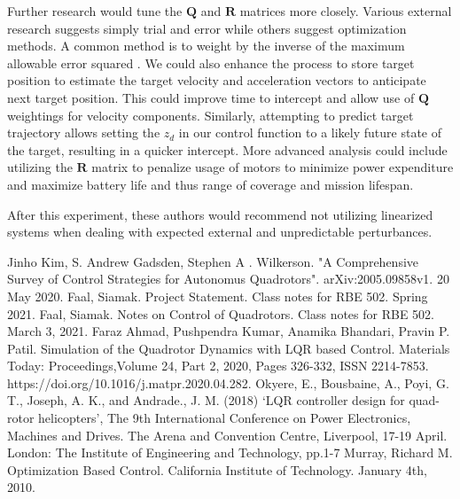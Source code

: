 \documentclass{article}
\begin{document}
\begin{multicols}{2}
\noindent Further research would tune the $\boldsymbol{Q}$ and $\boldsymbol{R}$ matrices more closely.  Various external research suggests simply trial and error while others suggest optimization methods. A common method is to weight by the inverse of the maximum allowable error squared \cite{mur}. We could also enhance the process to store target position to estimate the target velocity and acceleration vectors to anticipate next target position. This could improve time to intercept and allow use of $\boldsymbol{Q}$ weightings for velocity components. Similarly, attempting to predict target trajectory allows setting the $z_d$ in our control function to a likely future state of the target, resulting in a quicker intercept. More advanced analysis could include utilizing the $\boldsymbol{R}$ matrix to penalize usage of motors to minimize power expenditure and maximize battery life and thus range of coverage and mission lifespan.

\noindent After this experiment, these authors would recommend not utilizing linearized systems when dealing with expected external and unpredictable perturbances.
\label{References}

\begin{thebibliography}{10}
Jinho Kim, S. Andrew Gadsden, Stephen A . Wilkerson.
"A Comprehensive Survey of Control Strategies for Autonomus Quadrotors".
arXiv:2005.09858v1.
20 May 2020.
Faal, Siamak. Project Statement.  Class notes for RBE 502. Spring 2021.
Faal, Siamak. Notes on Control of Quadrotors. Class notes for RBE 502. March 3, 2021.
Faraz Ahmad, Pushpendra Kumar, Anamika Bhandari, Pravin P. Patil.
Simulation of the Quadrotor Dynamics with LQR based Control.
Materials Today: Proceedings,Volume 24, Part 2, 2020, Pages 326-332,
ISSN 2214-7853.
https://doi.org/10.1016/j.matpr.2020.04.282.
Okyere, E., Bousbaine, A., Poyi, G. T., Joseph, A. K., and Andrade.,
J. M. (2018) ‘LQR controller design for quad-rotor helicopters’,
The 9th International Conference on Power Electronics, Machines
and Drives. The Arena and Convention Centre, Liverpool, 17-19
April. London: The Institute of Engineering and Technology, pp.1-7
Murray, Richard M. Optimization Based Control.  California Institute of Technology. January 4th, 2010.




\end{thebibliography}

\end{multicols}
\end{document}
